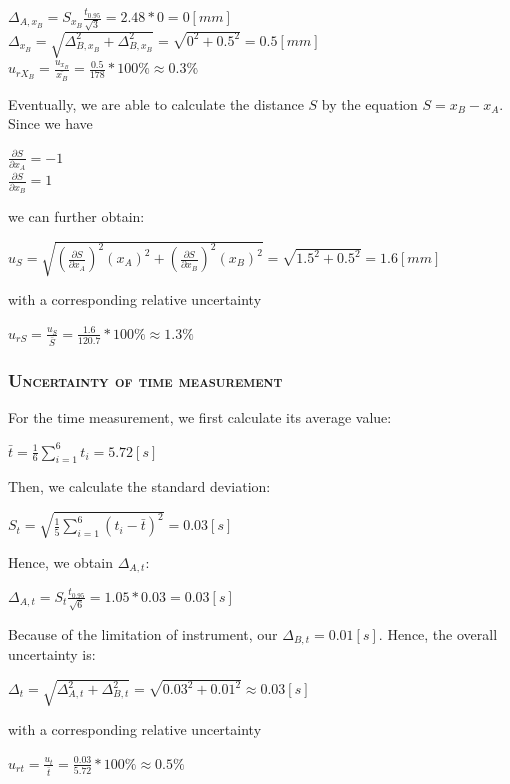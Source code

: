 \documentclass[a4paper,12pt]{article}
\begin{document}
\begin{appendices}
\begin{center}
      $\displaystyle\Delta_{A,x_B} = S_{x_B} \frac{t_{0.95}}{\sqrt{3}} = 2.48*0 = 0 [mm]$\\[2 mm]
      $\Delta_{x_B} = \sqrt{\Delta_{B,x_B}^2 + \Delta_{B,x_B}^2} = \sqrt{0^2 + 0.5^2} = 0.5 [mm]$ \\[2 mm]
      $\displaystyle u_{rX_B} = \frac{u_{x_B}}{\bar{x_B}} = \frac{0.5}{178}*100\% \approx 0.3\%$
      \end{center}
      \par Eventually, we are able to calculate the distance $S$ by the equation $S = x_B - x_A$.
      Since we have
      \begin{center}
      $\displaystyle \frac{\partial S}{\partial{x_A}} = -1 $\\ [2 mm]
      $\displaystyle \frac{\partial S}{\partial{x_B}} = 1 $
      \end{center}
      we can further obtain:
      \begin{center}
      $\displaystyle u_S = \sqrt{(\frac{\partial S}{\partial{x_A}})^2(x_A)^2 + (\frac{\partial S}{\partial{x_B}})^2(x_B)^2} = \sqrt{1.5^2 + 0.5^2} = 1.6 [mm]$
      \end{center}
      with a corresponding relative uncertainty 
      \begin{center}
      $\displaystyle u_{rS} = \frac{u_S}{\bar{S}} = \frac{1.6}{120.7} * 100\% \approx 1.3 \%$
      \end{center}
      
      \subsubsection{\textsc{Uncertainty of time measurement}}
      For the time measurement, we first calculate its average value:
      \begin{center}
      $\displaystyle\bar{t} = \frac{1}{6}\sum_{i=1}^6t_i = 5.72 [s]$
      \end{center}
      Then, we calculate the standard deviation:
      \begin{center}
      $\displaystyle S_t = \sqrt{\frac{1}{5}\sum_{i=1}^6(t_i - \bar{t})^2} = 0.03 [s]$
      \end{center}
      Hence, we obtain $\Delta_{A,t}$:
      \begin{center}
      $\displaystyle\Delta_{A,t} = S_t \frac{t_{0.95}}{\sqrt{6}} = 1.05*0.03 = 0.03 [s]$
      \end{center}
      Because of the limitation of instrument, our $\Delta_{B,t} = 0.01 [s]$. Hence, the overall uncertainty is:
      \begin{center}
      $\Delta_t = \sqrt{\Delta_{A,t}^2 + \Delta_{B,t}^2} = \sqrt{0.03^2 + 0.01^2} \approx 0.03 [s]$
      \end{center}
      with a corresponding relative uncertainty
      \begin{center}
      $\displaystyle u_{rt} = \frac{u_t}{\bar{t}} = \frac{0.03}{5.72}*100\% \approx 0.5\%$
      \end{center}      
      

\end{appendices}
\end{document}
